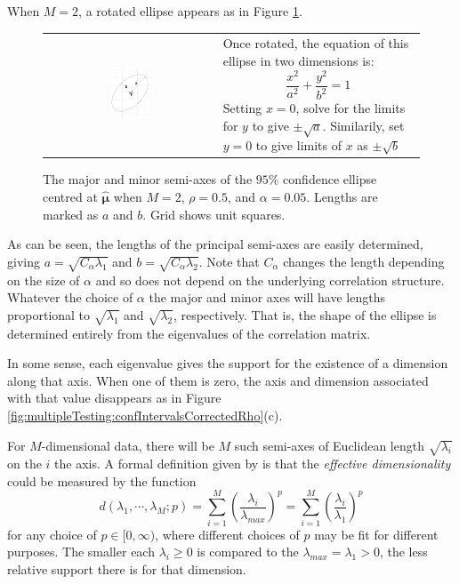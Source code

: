 \documentclass[letterpaper,12pt,oneside,final]{article}
\newcommand{\sv}[1]{\boldsymbol{#1}}   %
\begin{document}
When $M = 2$, a rotated ellipse appears as in Figure \ref{fig:multipleTesting:ellipseAxes}. 
\begin{figure}[htp]
\begin{center}
\begin{tabular}{cp{}}
\includegraphics[width = 0.30\textwidth]{./img/ellipseAxesRho5.png} &
\vspace{-0.2\textheight}
{\footnotesize
Once rotated, the equation of this ellipse in two dimensions is:
 \[
\frac{x^2}{a^2} + \frac{y^2}{b^2}  = 1
\]
Setting $x = 0$, solve for the limits for $y$ to give $\pm \sqrt{a}$.
Similarily, set $y =0$ to give limits of $x$ as $\pm \sqrt{b}$}
\end{tabular}
\end{center}
\caption{The major and minor semi-axes of the $95\%$ confidence ellipse centred at $\widehat{\sv{\mu}}$ when $M =2$,  $\rho = 0.5$, and $\alpha = 0.05$.  Lengths are marked as $a$ and $b$.   Grid shows unit squares.}
\label{fig:multipleTesting:ellipseAxes}
\end{figure}
As can be seen, the lengths of the principal semi-axes are easily determined, giving $a = \sqrt{ C_\alpha  \lambda_1}$ and $b = \sqrt{ C_\alpha \lambda_2}$. Note that $C_\alpha$ changes the length depending on the size of $\alpha$ and so does not depend on the underlying correlation structure. Whatever the choice of $\alpha$ the major and minor axes will have lengths proportional to $\sqrt{\lambda_1}$ and $\sqrt{\lambda_2}$, respectively. That is, the shape of the ellipse is determined entirely from the eigenvalues of the correlation matrix.

In some sense, each eigenvalue gives the support for the existence of a dimension along that axis. When one of them is zero, the axis and dimension associated with that value disappears as in Figure \ref{fig:multipleTesting:confIntervalsCorrectedRho}(c).

For $M$-dimensional data, there will be $M$ such semi-axes of Euclidean length $\sqrt{\lambda_i}$ on the $i$ the axis. A formal definition given by \cite{oldford1987n} is that the \emph{effective dimensionality} could be measured by the function
\[
d(\lambda_1, \cdots, \lambda_M; p) = \sum_{i = 1}^M  \left( \frac{\lambda_i}{\lambda_{max}}\right)^{p} = \sum_{i = 1}^M  \left( \frac{\lambda_i}{\lambda_1}\right)^{p}
\]
for any choice of $p \in [0, \infty)$, where different choices of $p$ may be fit for different purposes.  The smaller each $\lambda_i \ge 0$ is compared to the $\lambda_{max} = \lambda_1 > 0$, the less relative support there is for that dimension.
\end{document}
